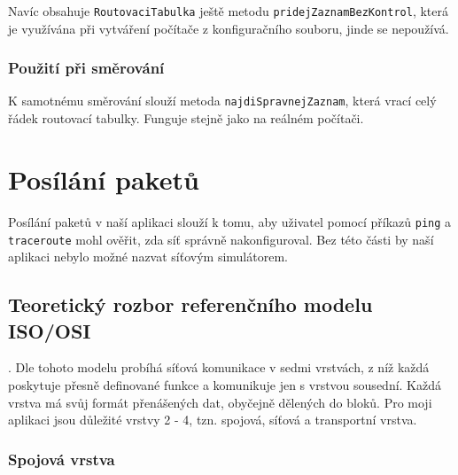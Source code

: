 Navíc obsahuje \verb|RoutovaciTabulka| ještě metodu \verb|pridejZaznamBezKontrol|, která je využívána při vytváření počítače z konfiguračního souboru, jinde se nepoužívá.

\subsubsection{Použití při směrování}

K samotnému směrování slouží metoda \verb|najdiSpravnejZaznam|, která vrací celý řádek routovací tabulky. Funguje stejně jako na reálném počítači.




\section{Posílání paketů}


Posílání paketů v naší aplikaci slouží k tomu, aby uživatel pomocí příkazů \verb|ping| a \verb|traceroute| mohl ověřit, zda síť správně nakonfiguroval. Bez této části by naší aplikaci nebylo možné nazvat síťovým simulátorem.


\subsection{Teoretický rozbor referenčního modelu ISO/OSI}

\cite{wiki:referencni_model}. Dle tohoto modelu probíhá síťová komunikace v sedmi vrstvách, z níž každá poskytuje přesně definované funkce a komunikuje jen s vrstvou sousední. Každá vrstva má svůj formát přenášených dat, obyčejně dělených do bloků. Pro moji aplikaci jsou důležité vrstvy 2 - 4, tzn. spojová, síťová a transportní vrstva.

\subsubsection{Spojová vrstva}

